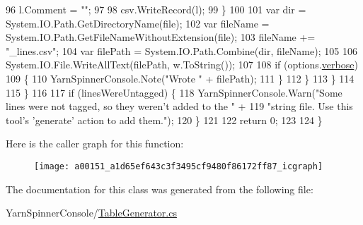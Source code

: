 \begin{DoxyCode}
96                             l.Comment = \textcolor{stringliteral}{""};
97 
98                             csv.WriteRecord(l);
99                         \}
100 
101                         var dir = System.IO.Path.GetDirectoryName(file);
102                         var fileName = System.IO.Path.GetFileNameWithoutExtension(file);
103                         fileName += \textcolor{stringliteral}{"\_lines.csv"};
104                         var filePath = System.IO.Path.Combine(dir, fileName);
105 
106                         System.IO.File.WriteAllText(filePath, w.ToString());
107 
108                         \textcolor{keywordflow}{if} (options.\hyperlink{a00040_ada4d83d1756918f362d55f6649b82b17}{verbose})
109                         \{
110                             YarnSpinnerConsole.Note(\textcolor{stringliteral}{"Wrote "} + filePath);
111                         \}
112                     \}
113                 \}
114 
115             \}
116 
117             \textcolor{keywordflow}{if} (linesWereUntagged) \{
118                 YarnSpinnerConsole.Warn(\textcolor{stringliteral}{"Some lines were not tagged, so they weren't added to the "} +
119                                \textcolor{stringliteral}{"string file. Use this tool's 'generate' action to add them."});
120             \}
121 
122             \textcolor{keywordflow}{return} 0;
123 
124         \}
\end{DoxyCode}


Here is the caller graph for this function\-:
\nopagebreak
\begin{figure}[H]
\begin{center}
\leavevmode
\texttt{[image: a00151\_a1d65ef643c3f3495cf9480f86172ff87\_icgraph]}
\end{center}
\end{figure}




The documentation for this class was generated from the following file\-:\begin{DoxyCompactItemize}
\item 
Yarn\-Spinner\-Console/\hyperlink{a00301}{Table\-Generator.\-cs}\end{DoxyCompactItemize}
